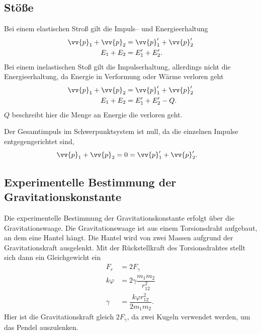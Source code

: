 \subsection{Stöße}
Bei einem elastischen Stroß gilt die Impuls-- und Energieerhaltung
\begin{align} 
        \vv{p}_1+\vv{p}_2&=\vv{p}_1'+\vv{p}_2'\\
        E_1+E_2&=E_1'+E_2'
.\end{align} 
Bei einem inelastischen Stoß gilt die Impulserhaltung, allerdings nicht die Energieerhaltung, da Energie in Verformung oder Wärme verloren geht
\begin{align} 
        \vv{p}_1+\vv{p}_2&=\vv{p}_1'+\vv{p}_2'\\
        E_1+E_2&=E_1'+E_2'-Q
.\end{align} 
$Q$ beschreibt hier die Menge an Energie die verloren geht.\par
Der Gesamtimpuls im Schwerpunktsystem ist null, da die einzelnen Impulse entgegengerichtet sind,
\begin{align} 
        \vv{p}_1+\vv{p}_2&=0=\vv{p}_1'+\vv{p}_2'
.\end{align} 

\subsection{Experimentelle Bestimmung der Gravitationskonstante}
Die experimentelle Bestimmung der Gravitationskonstante erfolgt über die Gravitationswaage. 
Die Gravitationswaage ist aus einem Torsionsdraht aufgebaut, an dem eine Hantel hängt.
Die Hantel wird von zwei Massen aufgrund der Gravitationskraft ausgelenkt.
Mit der Rückstellkraft des Torsionsdrahtes stellt sich dann ein Gleichgewicht ein
\begin{align} 
        F_r&=2F_\gamma \\
        k\varphi &=2\gamma \dfrac{m_1m_2}{r_{12}^2}\\
        \gamma &=\dfrac{k\varphi r_{12}^2}{2m_1m_2}
.\end{align} 
Hier ist die Gravitationskraft gleich $2F_\gamma $, da zwei Kugeln verwendet werden, um das Pendel auszulenken.

